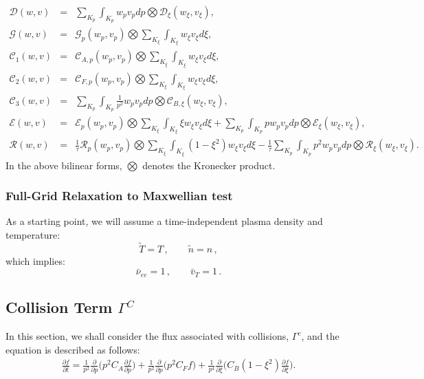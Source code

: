 \documentclass[preprint,11pt]{elsarticle}
\newcommand{\bq}{\begin{equation}}
\newcommand{\eq}{\end{equation}}
\begin{document}
\begin{eqnarray*}
\mathcal{D}(w,v) &=& 
\sum_{K_p}\int_{K_p}w_pv_pdp\bigotimes\mathcal{D}_{\xi}(w_{\xi},v_{\xi}), \\
\mathcal{G}(w,v)&=&
\mathcal{G}_{p}(w_p,v_p)\bigotimes\sum_{K_{\xi}}\int_{K_{\xi}}w_{\xi}v_{\xi}d\xi,\\
\mathcal{C}_1(w,v) &=&
\mathcal{C}_{A,p}(w_p,v_p)\bigotimes\sum_{K_{\xi}}\int_{K_{\xi}}w_{\xi}v_{\xi}d\xi,\\
\mathcal{C}_2(w,v) &=&
\mathcal{C}_{F,p}(w_p,v_p)\bigotimes\sum_{K_{\xi}}\int_{K_{\xi}}w_{\xi}v_{\xi}d\xi,\\
\mathcal{C}_3(w,v) &=&
\sum_{K_p}\int_{K_p}\frac{1}{p^2}w_pv_pdp\bigotimes\mathcal{C}_{B,\xi}(w_{\xi},v_{\xi}),\\
\mathcal{E}(w,v) &=& 
\mathcal{E}_{p}(w_p,v_p)\bigotimes\sum_{K_{\xi}}\int_{K_{\xi}}\xi w_{\xi}v_{\xi}d\xi+\sum_{K_{p}}\int_{K_{p}}p w_{p}v_{p}dp\bigotimes\mathcal{E}_{\xi}(w_{\xi},v_{\xi}),\\
\mathcal{R}(w,v)&=&\frac{1}{\tau}\mathcal{R}_p(w_p,v_p)\bigotimes\sum_{K_{\xi}}\int_{K_{\xi}}(1-\xi^2)w_{\xi}v_{\xi}d\xi-\frac{1}{\tau}\sum_{K_p}\int_{K_p}p^2w_pv_pdp\bigotimes\mathcal{R}_{\xi}(w_{\xi},v_{\xi}).
\end{eqnarray*}
In the above bilinear forms, $\bigotimes$ denotes the Kronecker product. 


\subsubsection{Full-Grid Relaxation to Maxwellian test}
\label{sec:fg-relaxation}
As a starting point, we will assume a time-independent plasma density and temperature: 
\bq
{\tilde T}=T \, , \qquad {\tilde n}=n \, ,
\eq
which implies:
\bq
 \bar{\nu}_{ee}=1 \, , \qquad \bar{v}_T=1 \, .
 \eq

 
\subsection{Collision Term $\Gamma^C$}
\label{sec:FullModel-1}
%
In this section, we shall consider the flux associated with collisions, $\Gamma^c$, and the equation is described as follows:
\begin{eqnarray}
\frac{\partial f}{\partial t} = \frac{1}{{ p}^2}\frac{\partial}{\partial { p}}\bigg({ p}^2C_A\frac{\partial f}{\partial { p}}\bigg) + \frac{1}{{ p}^2}\frac{\partial}{\partial { p}}\bigg({ p}^2C_F f\bigg)+\frac{1}{{ p}^4}\frac{\partial}{\partial\xi}\bigg(C_B(1-\xi^2)\frac{\partial f}{\partial\xi}\bigg).
\label{2DMomentumEqn}
\end{eqnarray}
\end{document}
